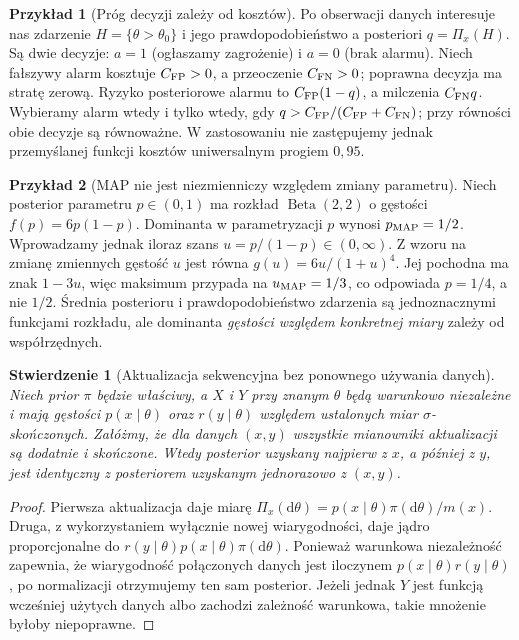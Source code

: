 \documentclass[11pt,a4paper,oneside]{report}
\numberwithin{equation}{chapter}
\theoremstyle{plain}
\newtheorem{stwierdzenie}[twierdzenie]{Stwierdzenie}
\theoremstyle{definition}
\newtheorem{przyklad}{Przykład}[chapter]
\theoremstyle{remark}
\newcommand{\dd}{\mathrm d}
\begin{document}
\begin{przyklad}[Próg decyzji zależy od kosztów]
Po obserwacji danych interesuje nas zdarzenie $H=\{\theta>\theta_0\}$
i jego prawdopodobieństwo a posteriori $q=\Pi_x(H)$.
Są dwie decyzje: $a=1$ (ogłaszamy zagrożenie) i $a=0$ (brak alarmu).
Niech fałszywy alarm kosztuje $C_{\rm FP}>0$, a przeoczenie
$C_{\rm FN}>0$; poprawna decyzja ma stratę zerową.
Ryzyko posteriorowe alarmu to $C_{\rm FP}(1-q)$,
a milczenia $C_{\rm FN}q$. Wybieramy alarm wtedy i tylko wtedy, gdy
$q>C_{\rm FP}/(C_{\rm FP}+C_{\rm FN})$;
przy równości obie decyzje są równoważne.
W zastosowaniu nie zastępujemy jednak przemyślanej funkcji kosztów
uniwersalnym progiem $0{,}95$.
\end{przyklad}

\begin{przyklad}[MAP nie jest niezmienniczy względem zmiany parametru]
Niech posterior parametru $p\in(0,1)$ ma rozkład
$\operatorname{Beta}(2,2)$ o gęstości $f(p)=6p(1-p)$.
Dominanta w parametryzacji $p$ wynosi $p_{\rm MAP}=1/2$.
Wprowadzamy jednak iloraz szans $u=p/(1-p)\in(0,\infty)$.
Z wzoru na zmianę zmiennych gęstość $u$ jest równa
$g(u)=6u/(1+u)^4$. Jej pochodna ma znak $1-3u$,
więc maksimum przypada na $u_{\rm MAP}=1/3$,
co odpowiada $p=1/4$, a nie $1/2$.
Średnia posterioru i prawdopodobieństwo zdarzenia są
jednoznacznymi funkcjami rozkładu, ale dominanta
\emph{gęstości względem konkretnej miary} zależy od współrzędnych.
\end{przyklad}

\begin{stwierdzenie}[Aktualizacja sekwencyjna bez ponownego używania danych]
\label{prop:sequential-bayes}
Niech prior $\pi$ będzie właściwy, a $X$ i $Y$ przy znanym
$\theta$ będą warunkowo niezależne i mają gęstości
$p(x\mid\theta)$ oraz $r(y\mid\theta)$ względem ustalonych
miar $\sigma$-skończonych. Załóżmy, że dla danych $(x,y)$
wszystkie mianowniki aktualizacji są dodatnie i skończone.
Wtedy posterior uzyskany najpierw z $x$, a później z $y$,
jest identyczny z posteriorem uzyskanym jednorazowo z $(x,y)$.
\end{stwierdzenie}
\begin{proof}
Pierwsza aktualizacja daje miarę
$\Pi_x(\dd\theta)=p(x\mid\theta)\pi(\dd\theta)/m(x)$.
Druga, z wykorzystaniem wyłącznie nowej wiarygodności,
daje jądro proporcjonalne do
$r(y\mid\theta)p(x\mid\theta)\pi(\dd\theta)$.
Ponieważ warunkowa niezależność zapewnia, że wiarygodność
połączonych danych jest iloczynem $p(x\mid\theta)r(y\mid\theta)$,
po normalizacji otrzymujemy ten sam posterior.
Jeżeli jednak $Y$ jest funkcją wcześniej użytych danych albo
zachodzi zależność warunkowa, takie mnożenie byłoby niepoprawne.
\end{proof}
\end{document}
